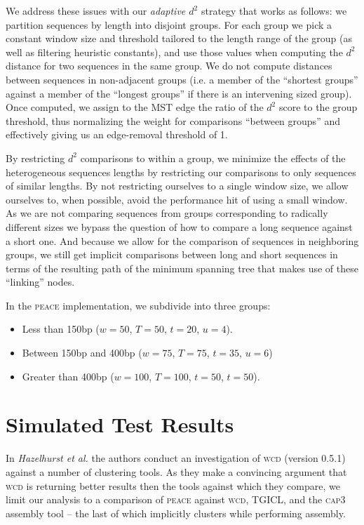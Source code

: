 \documentclass[a4paper,12pt]{article}
\newcommand{\mc}[1]{#1}   %
\newcommand{\tgicl} {{\small TGICL}}
\begin{document}
\begin{appendix}
\mc{We address these issues with our {\it adaptive $d^2$} strategy that
works as follows: we partition sequences by length into disjoint groups.  For each
group we pick a constant window size and threshold tailored to the
length range of the group (as well as filtering heuristic constants),
and use those values when computing the $d^2$ distance for two
sequences in the same group.  We do not compute distances between
sequences in non-adjacent groups (i.e. a member of the ``shortest
groups'' against a member of the ``longest groups'' if there is an
intervening sized group).  Once computed, we assign to the MST
edge the ratio of the $d^2$ score to the group threshold, thus
normalizing the weight for comparisons ``between groups'' and
effectively giving us an edge-removal threshold of 1.}

\mc{By restricting $d^2$ comparisons to within a group, we minimize
  the effects of the heterogeneous sequences lengths by restricting
  our comparisons to only sequences of similar lengths.  By not
  restricting ourselves to a single window size, we allow ourselves
  to, when possible, avoid the performance hit of using a small
  window.  As we are not comparing sequences from groups corresponding
  to radically different sizes we bypass the question of how to
  compare a long sequence against a short one.  And because we allow
  for the comparison of sequences in neighboring groups, we still get
  implicit comparisons between long and short sequences in terms of
  the resulting path of the minimum spanning tree that makes use of
  these ``linking'' nodes.}

\mc{In the \textsc{peace} implementation, we subdivide into three groups:
\begin{itemize}
\item Less than 150bp ($w=50$, $T=50$, $t=20$, $u=4$).
\item Between 150bp and 400bp ($w=75$, $T=75$, $t=35$, $u=6$)
\item Greater than 400bp ($w=100$, $T=100$, $t=50$, $t=50$).
\end{itemize}}




\section{Simulated Test Results}

In {\it Hazelhurst et al.} \cite{Hazelhurst08a} the authors conduct
an investigation of \textsc{wcd} \mc{(version 0.5.1)} against a number of clustering
tools.  As they make a convincing argument that \textsc{wcd} is returning
better results then the tools against which they compare, we limit our
analysis to a comparison of \textsc{peace} against \textsc{wcd},
\tgicl \cite{Pertea2003}, and the \textsc{cap3} assembly
tool \cite{Huang99} -- the last of which implicitly clusters while
performing assembly. 


\end{appendix}
\end{document}
